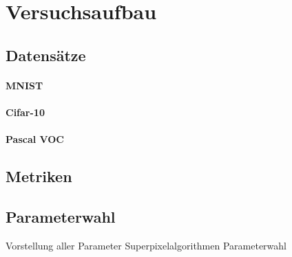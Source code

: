 \section{Versuchsaufbau}
\label{versuchsaufbau}

\subsection{Datensätze}
\label{datensaetze}

\paragraph{MNIST}
\label{MNIST}

\cite{mnist}

\paragraph{Cifar-10}
\label{cifar_10}

\cite{cifar_10}

\paragraph{Pascal VOC}
\label{pascal_voc}

\cite{pascal_voc}

\subsection{Metriken}
\label{metriken}

\subsection{Parameterwahl}
\label{parameterwahl}

Vorstellung aller Parameter
Superpixelalgorithmen Parameterwahl
